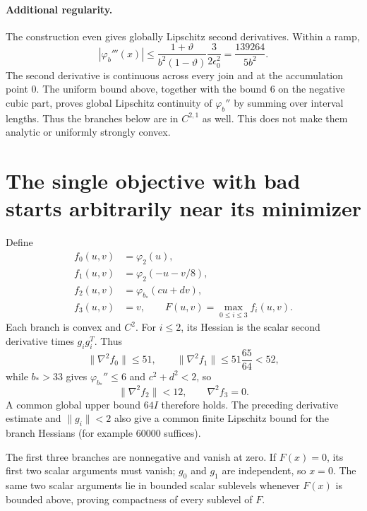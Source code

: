 \paragraph{Additional regularity.}
The construction even gives globally Lipschitz second derivatives. Within a ramp,
\[
 |\varphi_b'''(x)|
 \le\frac{1+\vartheta}{b^2(1-\vartheta)}
       \frac{3}{2\epsilon_0^2}
 =\frac{139264}{5b^2}.
\]
The second derivative is continuous across every join and at the accumulation point $0$. The uniform bound above, together with the bound $6$ on the negative cubic part, proves global Lipschitz continuity of $\varphi_b''$ by summing over interval lengths. Thus the branches below are in $C^{2,1}$ as well. This does not make them analytic or uniformly strongly convex.


\setcounter{section}{4}
\setcounter{theorem}{1}
\setcounter{lemma}{2}
\setcounter{corollary}{0}
\setcounter{proposition}{0}
\setcounter{remark}{0}
\setcounter{equation}{8}
\section{The single objective with bad starts arbitrarily near its minimizer}
Define
\begin{equation}\label{D:fullobjective}
\begin{split}
 f_0(u,v)&=\varphi_2(u),\\
 f_1(u,v)&=\varphi_2(-u-v/8),\\
 f_2(u,v)&=\varphi_{b_*}(cu+dv),\\
 f_3(u,v)&=v,\qquad F(u,v)=\max_{0\le i\le3}f_i(u,v).
\end{split}
\end{equation}
Each branch is convex and $C^2$. For $i\le2$, its Hessian is the scalar second derivative times $g_i g_i^T$. Thus
\[
 \|\nabla^2f_0\|\le51,\qquad
 \|\nabla^2f_1\|\le51\frac{65}{64}<52,
\]
while $b_*>33$ gives $\varphi_{b_*}''\le6$ and $c^2+d^2<2$, so
\[
 \|\nabla^2f_2\|<12,\qquad\nabla^2f_3=0.
\]
A common global upper bound $64I$ therefore holds. The preceding derivative estimate and $\|g_i\|<2$ also give a common finite Lipschitz bound for the branch Hessians (for example $60000$ suffices).

The first three branches are nonnegative and vanish at zero. If $F(x)=0$, its first two scalar arguments must vanish; $g_0$ and $g_1$ are independent, so $x=0$. The same two scalar arguments lie in bounded scalar sublevels whenever $F(x)$ is bounded above, proving compactness of every sublevel of $F$.

